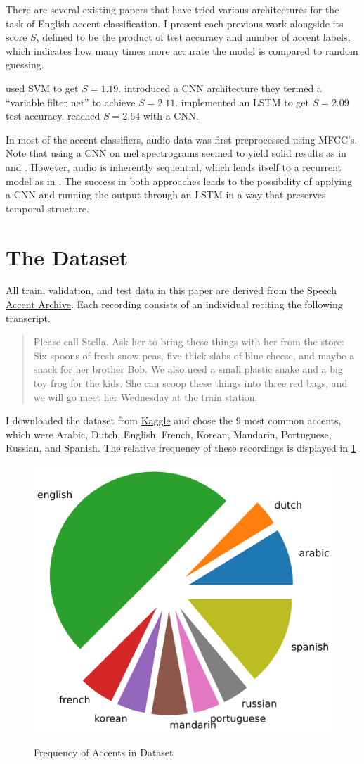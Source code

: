 \documentclass[11pt,a4paper]{article}
\begin{document}
There are several existing papers that have tried various architectures for the task of English accent classification. I present each previous work alongside its score \(S\), defined to be the product of test accuracy and number of accent labels, which indicates how many times more accurate the model is compared to random guessing.

\citet{chen} used SVM to get \(S = 1.19\). \citet{ahmed} introduced a CNN architecture they termed a ``variable filter net'' to achieve \(S = 2.11\). \citet{shih} implemented an LSTM to get \(S = 2.09\) test accuracy. \citet{sheng} reached \(S = 2.64\) with a CNN.

In most of the accent classifiers, audio data was first preprocessed using MFCC's. Note that using a CNN on mel spectrograms seemed to yield solid results as in \citet{ahmed} and \citet{sheng}. However, audio is inherently sequential, which lends itself to a recurrent model as in \citet{shih}. The success in both approaches leads to the possibility of applying a CNN and running the output through an LSTM in a way that preserves temporal structure.

\section{The Dataset} \label{sec:dataset}

All train, validation, and test data in this paper are derived from the \href{https://accent.gmu.edu/}{Speech Accent Archive}. Each recording consists of an individual reciting the following transcript.
\begin{quote}
  Please call Stella. Ask her to bring these things with her from the store: Six spoons of fresh snow peas, five thick slabs of blue cheese, and maybe a snack for her brother Bob. We also need a small plastic snake and a big toy frog for the kids. She can scoop these things into three red bags, and we will go meet her Wednesday at the train station.
\end{quote}

I downloaded the dataset from \href{https://www.kaggle.com/rtatman/speech-accent-archive}{Kaggle} and chose the 9 most common accents, which were Arabic, Dutch, English, French, Korean, Mandarin, Portuguese, Russian, and Spanish. The relative frequency of these recordings is displayed in \cref{fig:accent_freq}
\begin{figure}[h]
  \centering
  \caption{Frequency of Accents in Dataset}
  \includegraphics[width=.48\textwidth]{freq.png}
  \label{fig:accent_freq}
\end{figure}
\end{document}
